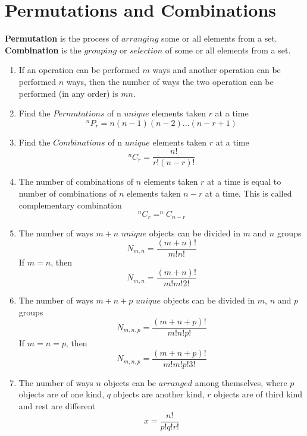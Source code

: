 \documentclass[a4paper]{book}
\begin{document}
\section{Permutations and Combinations}
\textbf{Permutation} is the process of $arranging$ some or all elements from a set. \textbf{Combination} is the $grouping$ or $selection$ of some or all elements from a set. 
\begin{enumerate}
\item If an operation can be performed $m$ ways and another operation can be performed $n$ ways, then the number of ways the two operation can be performed (in any order) is $mn$.
\item Find the $Permutations$ of n $unique$ elements taken $r$ at a time
\begin{equation}
^{n}P_{r} = n(n - 1)(n - 2)...(n - r + 1)
\end{equation}
\item Find the $Combinations$ of n $unique$ elements taken $r$ at a time
\begin{equation}
^{n}C_{r} = \frac{n!}{r!(n - r)!}
\end{equation}
\item The number of combinations of $n$ elements taken $r$ at a time is equal to number of combinations of $n$ elements taken $n - r$ at a time. This is called complementary combination
\begin{equation}
^{n}C_{r} = ^{n}C_{n - r}
\end{equation}
\item The number of ways $m + n$ $unique$ objects can be divided in $m$ and $n$ groups
\begin{equation}
N_{m,n} = \frac{(m + n)!}{m!n!}
\end{equation}
If $m = n$, then
\begin{equation}
N_{m,n} = \frac{(m + n)!}{m!m!2!}
\end{equation}
\item The number of ways $m + n + p$ $unique$ objects can be divided in $m$, $n$ and $p$ groups
\begin{equation}
N_{m,n,p} = \frac{(m + n + p)!}{m!n!p!}
\end{equation}
If $m = n = p$, then
\begin{equation}
N_{m,n,p} = \frac{(m + n + p)!}{m!m!p!3!}
\end{equation}
\item The number of ways $n$ objects can be $arranged$ among themselves, where $p$ objects are of one kind, $q$ objects are another kind, $r$ objects are of third kind and rest are different 
\begin{equation}
x = \frac{n!}{p!q!r!}
\end{equation}
\end{enumerate}
\end{document}
